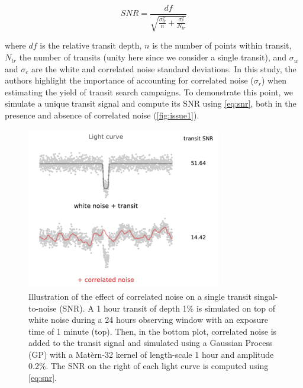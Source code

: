 \documentclass{aastex631}
\begin{document}
\begin{equation}\label{eq:snr}
  SNR= \frac{df}{\sqrt{\frac{\sigma_w^2}{n} + \frac{\sigma_c^2}{N_{tr}}}}
\end{equation}

where $df$ is the relative transit depth, $n$ is the number of points within transit, $N_{tr}$ the number of transits (unity here since we consider a single transit), and $\sigma_w$ and $\sigma_c$ are the white and correlated noise standard deviations. In this study, the authors highlight the importance of accounting for correlated noise ($\sigma_r$) when estimating the yield of transit search campaigns. To demonstrate this point, we simulate a unique transit signal and compute its SNR using \autoref{eq:snr}, both in the presence and absence of correlated noise (\autoref{fig:issue1}).

\begin{figure}[H]
    \begin{centering}
        \includegraphics[width=8.5cm]{../figures/issue1.pdf}
        \caption{Illustration of the effect of correlated noise on a single transit singal-to-noise (SNR). A 1 hour transit of depth 1\% is simulated on top of white noise during a 24 hours observing window with an exposure time of 1 minute (top). Then, in the bottom plot, correlated noise is added to the transit signal and simulated using a Gaussian Process (GP) with a Matèrn-32 kernel of length-scale 1 hour and amplitude 0.2\%. The SNR on the right of each light curve is computed using \autoref{eq:snr}.}
        \label{fig:issue1}
    \end{centering}
\end{figure}
\end{document}
